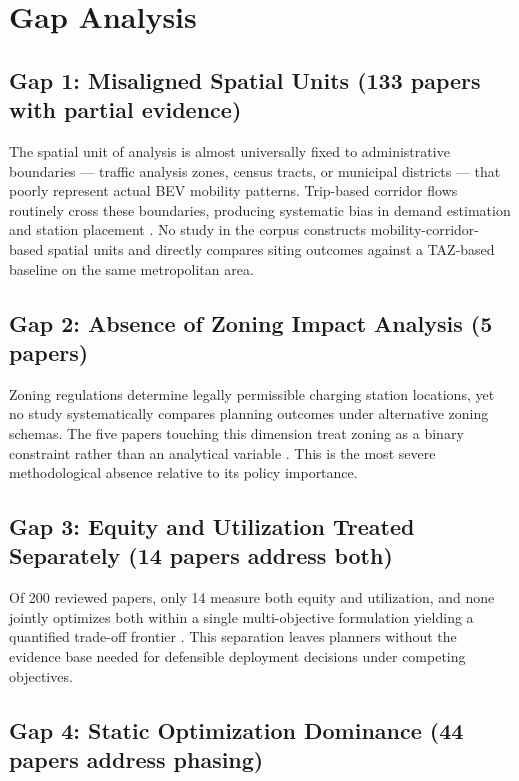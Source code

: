\documentclass[12pt,letterpaper]{article}
\begin{document}
\section{Gap Analysis}

\subsection{Gap 1: Misaligned Spatial Units (133 papers with partial evidence)}

The spatial unit of analysis is almost universally fixed to
administrative boundaries --- traffic analysis zones, census tracts, or
municipal districts --- that poorly represent actual BEV mobility
patterns.  Trip-based corridor flows routinely cross these boundaries,
producing systematic bias in demand estimation and station placement
\citep{babur2026,do2025}.  No study in the corpus constructs
mobility-corridor-based spatial units and directly compares siting
outcomes against a TAZ-based baseline on the same metropolitan area.

\subsection{Gap 2: Absence of Zoning Impact Analysis (5 papers)}

Zoning regulations determine legally permissible charging station
locations, yet no study systematically compares planning outcomes under
alternative zoning schemas.  The five papers touching this dimension
treat zoning as a binary constraint rather than an analytical variable
\citep{karakus2025,fariza2026}.  This is the most severe methodological
absence relative to its policy importance.

\subsection{Gap 3: Equity and Utilization Treated Separately (14 papers address both)}

Of 200 reviewed papers, only 14 measure both equity and utilization, and
none jointly optimizes both within a single multi-objective formulation
yielding a quantified trade-off frontier \citep{arief2023,najafzad2026}.
This separation leaves planners without the evidence base needed for
defensible deployment decisions under competing objectives.

\subsection{Gap 4: Static Optimization Dominance (44 papers address phasing)}
\end{document}
